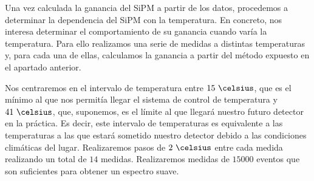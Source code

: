 Una vez calculada la ganancia del SiPM a partir de los  datos, procedemos a determinar la dependencia  del SiPM con la temperatura. En concreto, nos interesa determinar el comportamiento de su ganancia cuando varía la temperatura. Para ello realizamos una serie de medidas a distintas temperaturas y, para cada una de ellas, calculamos la ganancia a partir del método expuesto en el apartado anterior.

Nos centraremos en el intervalo de temperatura entre $15~\celsius$, que es el mínimo al que nos permitía llegar el sistema de control de temperatura y $41~\celsius$, que, suponemos, es el límite al que llegará nuestro futuro detector en la práctica. Es decir, este intervalo de temperaturas es equivalente a las temperaturas a las que estará sometido nuestro detector debido a las condiciones climáticas del lugar. Realizaremos pasos de $2~\celsius$ entre cada medida realizando un total de $14$ medidas. Realizaremos medidas de  $15000$ eventos  que son suficientes para obtener un espectro  suave. 

